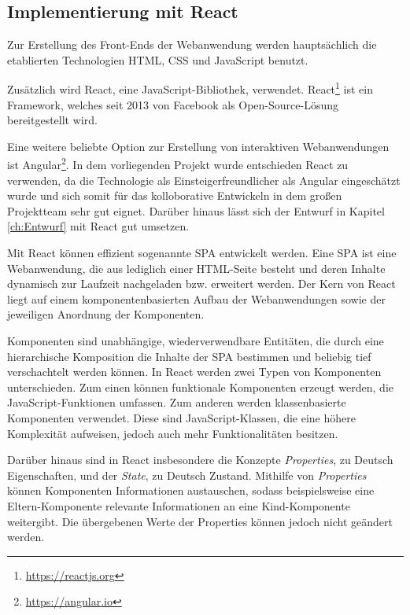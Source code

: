 \subsection{Implementierung mit React}
Zur Erstellung des Front-Ends der Webanwendung werden hauptsächlich die etablierten Technologien \ac{HTML}, \ac{CSS} und JavaScript benutzt.

Zusätzlich wird React, eine JavaScript-Bibliothek, verwendet.
React\footnote{\url{https://reactjs.org}} ist ein Framework, welches seit 2013 von Facebook als Open-Source-Lösung bereitgestellt wird.\autocite[Vgl.][S. 3]{React2019} 

Eine weitere beliebte Option zur Erstellung von interaktiven Webanwendungen ist Angular\footnote{\url{https://angular.io}}. In dem vorliegenden Projekt wurde entschieden React zu verwenden, da die Technologie als Einsteigerfreundlicher als Angular eingeschätzt wurde und sich somit für das kolloborative Entwickeln in dem großen Projektteam sehr gut eignet. Darüber hinaus lässt sich der Entwurf in Kapitel \vref{ch:Entwurf} mit React gut umsetzen.

Mit React können effizient sogenannte \ac{SPA} entwickelt werden. 
Eine \ac{SPA} ist eine Webanwendung, die aus lediglich einer \ac{HTML}-Seite besteht und deren Inhalte dynamisch zur Laufzeit nachgeladen bzw. erweitert werden.
Der Kern von React liegt auf einem komponentenbasierten Aufbau der Webanwendungen sowie der jeweiligen Anordnung der Komponenten.\autocite[Vgl.][S. 3]{React2019} 

Komponenten sind unabhängige, wiederverwendbare Entitäten, die durch eine hierarchische Komposition die Inhalte der \ac{SPA} bestimmen und beliebig tief verschachtelt werden können.
In React werden zwei Typen von Komponenten unterschieden. 
Zum einen können funktionale Komponenten erzeugt werden, die JavaScript-Funktionen umfassen. 
Zum anderen werden klassenbasierte Komponenten verwendet. 
Diese sind JavaScript-Klassen, die eine höhere Komplexität aufweisen, jedoch auch mehr Funktionalitäten besitzen. 

Darüber hinaus sind in React insbesondere die Konzepte \textit{Properties}, zu Deutsch Eigenschaften, und der \textit{State}, zu Deutsch Zustand. 
Mithilfe von \textit{Properties} können Komponenten Informationen austauschen, sodass beispielsweise eine Eltern-Komponente relevante Informationen an eine Kind-Komponente weitergibt. 
Die übergebenen Werte der Properties können jedoch nicht geändert werden. 

